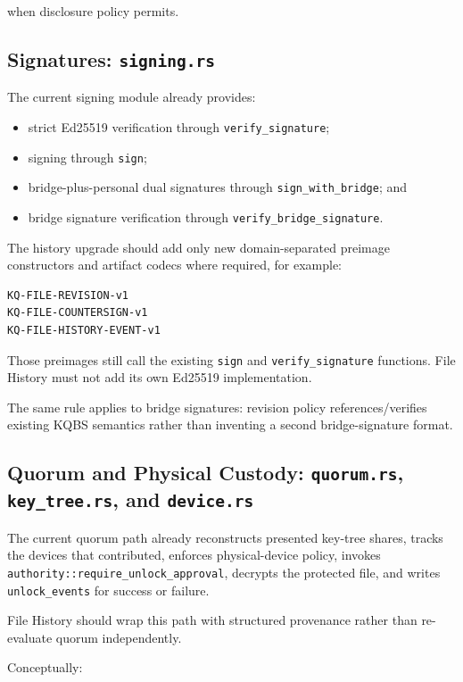 \documentclass[11pt]{article}
\begin{document}
when disclosure policy permits.

\subsection{Signatures: \texttt{signing.rs}}

The current signing module already provides:

\begin{itemize}[leftmargin=1.5em]
  \item strict Ed25519 verification through \texttt{verify\_signature};
  \item signing through \texttt{sign};
  \item bridge-plus-personal dual signatures through \texttt{sign\_with\_bridge}; and
  \item bridge signature verification through \texttt{verify\_bridge\_signature}.
\end{itemize}

The history upgrade should add only new domain-separated preimage constructors and artifact codecs where required, for example:

\begin{lstlisting}
KQ-FILE-REVISION-v1
KQ-FILE-COUNTERSIGN-v1
KQ-FILE-HISTORY-EVENT-v1
\end{lstlisting}

Those preimages still call the existing \texttt{sign} and \texttt{verify\_signature} functions. File History must not add its own Ed25519 implementation.

The same rule applies to bridge signatures: revision policy references/verifies existing KQBS semantics rather than inventing a second bridge-signature format.

\subsection{Quorum and Physical Custody: \texttt{quorum.rs}, \texttt{key\_tree.rs}, and \texttt{device.rs}}

The current quorum path already reconstructs presented key-tree shares, tracks the devices that contributed, enforces physical-device policy, invokes \texttt{authority::require\_unlock\_approval}, decrypts the protected file, and writes \texttt{unlock\_events} for success or failure.

File History should wrap this path with structured provenance rather than re-evaluate quorum independently.

Conceptually:
\end{document}
